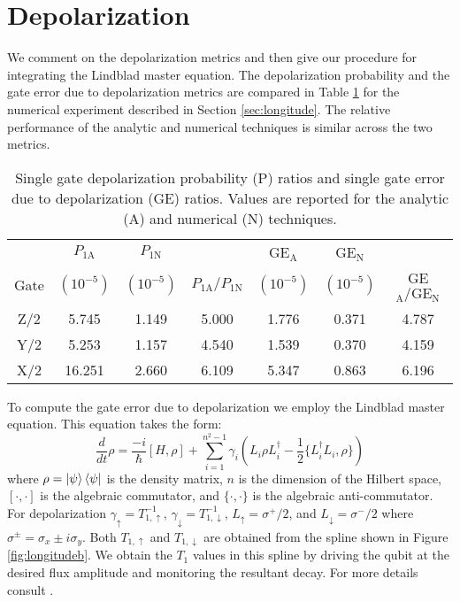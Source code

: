 \section{Depolarization \label{appendix:longitude}}
We comment on the depolarization metrics and then give
our procedure for integrating the Lindblad master equation.
The depolarization probability and the gate error due to
depolarization metrics are compared in Table \ref{tab:longitude} for the
numerical experiment described in Section \ref{sec:longitude}.
The relative performance of the analytic and numerical techniques
is similar across the two metrics.

\begin{table}[ht]
  \begin{tabular}{c | c | c | c | c | c | c}
         & $P_{1\textrm{A}}$ & $P_{1\textrm{N}}$ & & GE$_{\textrm{A}}$ & GE$_{\textrm{N}}$ &\\
    Gate & $(10^{-5})$ & $(10^{-5})$ & $P_{1\textrm{A}}/ P_{1\textrm{N}}$ & $(10^{-5})$ &
    $(10^{-5})$ & GE$_{\textrm{A}} / \textrm{GE}_{\textrm{N}}$\\
    \hline
    Z/2 & 5.745 & 1.149 & 5.000 & 1.776 & 0.371 & 4.787\\
    Y/2 & 5.253 & 1.157 & 4.540 & 1.539 & 0.370 & 4.159\\
    X/2 & 16.251 & 2.660 & 6.109 & 5.347 & 0.863 & 6.196\\
  \end{tabular}
  \caption{
    Single gate depolarization probability (P) ratios
    and single gate error due to depolarization (GE) ratios.
    Values are reported for the analytic (A) and numerical (N) techniques.
  }
  \label{tab:longitude}
\end{table}

To compute the gate error due to depolarization
we employ the Lindblad master equation. This equation takes the form:
\begin{equation}
  \frac{d}{dt} \rho = \frac{-i}{\hbar} [H, \rho]
  + \sum_{i = 1}^{n^{2} - 1} \gamma_{i} (L_{i} \rho L_{i}^{\dagger}
  - \frac{1}{2} \{L_{i}^{\dagger} L_{i}, \rho\})
\end{equation}
where $\rho = \ket{\psi}\bra{\psi}$ is the density matrix, $n$ is the
dimension of the Hilbert space,
$[\cdot, \cdot]$ is the algebraic commutator, and $\{\cdot, \cdot \}$ is the algebraic
anti-commutator.
For depolarization $\gamma_{\uparrow} = T_{1, \uparrow}^{-1}$,
$\gamma_{\downarrow} = T_{1, \downarrow}^{-1}$,
$L_{\uparrow} = \sigma^{+}/2$, and
$L_{\downarrow} = \sigma^{-}/2$ where $\sigma^{\pm} = \sigma_{x} \pm i \sigma_{y}$.
Both $T_{1, \uparrow}$ and $T_{1, \downarrow}$ are obtained from the spline
shown in Figure \ref{fig:longitudeb}.
We obtain the $T_{1}$ values in this spline
by driving the qubit at the desired flux amplitude
and monitoring the resultant decay.
For more details consult \cite{zhang2020universal}.


